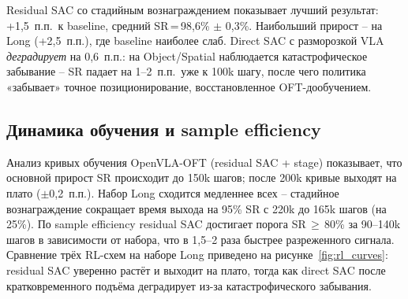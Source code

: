 \begin{table}[htbp]
\caption{Сравнение RL-схем на OpenVLA-OFT-7B (серия~2), SR (\%).}
\label{tab:rl_methods}
\centering
\footnotesize
\setlength{\tabcolsep}{4pt}
\renewcommand{\arraystretch}{1.15}
\end{table}

    Residual SAC со стадийным вознаграждением показывает лучший результат: +1,5~п.п.\ к baseline, средний SR\,=\,98,6\% $\pm$ 0,3\%. Наибольший прирост -- на Long (+2,5~п.п.), где baseline наиболее слаб. Direct SAC с разморозкой VLA \textit{деградирует} на 0,6~п.п.: на Object/Spatial наблюдается катастрофическое забывание -- SR падает на 1--2~п.п.\ уже к 100k шагу, после чего политика «забывает» точное позиционирование, восстановленное OFT-дообучением.

\subsection{Динамика обучения и sample efficiency}
\label{subsec:learning_curves}

    Анализ кривых обучения OpenVLA-OFT (residual SAC + stage) показывает, что основной прирост SR происходит до 150k шагов; после 200k кривые выходят на плато ($\pm$0,2~п.п.). Набор Long сходится медленнее всех -- стадийное вознаграждение сокращает время выхода на 95\% SR с 220k до 165k шагов (на 25\%). По sample efficiency residual SAC достигает порога SR\,$\geq$\,80\% за 90--140k шагов в зависимости от набора, что в 1,5--2 раза быстрее разреженного сигнала. Сравнение трёх RL-схем на наборе Long приведено на рисунке~\ref{fig:rl_curves}: residual SAC уверенно растёт и выходит на плато, тогда как direct SAC после кратковременного подъёма деградирует из-за катастрофического забывания.

